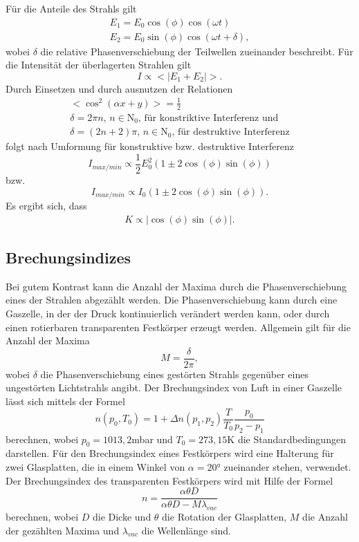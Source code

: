 Für die Anteile des Strahls gilt
\begin{gather}
  E_1 = E_0\cos(\phi)\cos(\omega t) \\
  E_2 = E_0\sin(\phi)\cos(\omega t + \delta),
\end{gather}
wobei $\delta$ die relative Phasenverschiebung der Teilwellen zueinander beschreibt.
Für die Intensität der überlagerten Strahlen gilt
\begin{equation*}
  I \propto <|E_1 + E_2|>.
\end{equation*}
Durch Einsetzen und durch ausnutzen der Relationen
\begin{gather*}
  <\cos^2(\alpha x + y)> = \frac{1}{2} \\
  \delta = 2\pi n , \, n\in\mathrm{N}_0,\, \text{für konstriktive Interferenz und} \\
  \delta = (2n+2)\pi,\, n\in\mathrm{N}_0,\, \text{für destruktive Interferenz}
\end{gather*}
folgt nach Umformung für konstruktive bzw. destruktive Interferenz
\begin{equation*}
  I_{max/min} \propto \frac{1}{2}E_0^2 (1 \pm 2\cos(\phi)\sin(\phi))
\end{equation*}
bzw.
\begin{equation}
  I_{max/min} \propto I_0(1 \pm 2\cos(\phi)\sin(\phi)).
\end{equation}
Es ergibt sich, dass
\begin{align}
  K \propto |\cos(\phi)\sin(\phi)|.
\end{align}

\subsection{Brechungsindizes}
Bei gutem Kontrast kann die Anzahl der Maxima durch die Phasenverschiebung eines
der Strahlen abgezählt werden. Die Phasenverschiebung kann durch eine Gaszelle,
in der der Druck kontinuierlich verändert werden kann, oder durch einen rotierbaren
transparenten Festkörper erzeugt werden.
Allgemein gilt für die Anzahl der Maxima
\begin{equation*}
  M = \frac{\delta}{2\pi},
\end{equation*}
wobei $\delta$ die Phasenverschiebung eines gestörten Strahls gegenüber eines
ungestörten Lichtstrahls angibt.
Der Brechungsindex von Luft in einer Gaszelle lässt sich mittels der Formel
\begin{equation}
  n(p_0, T_0) = 1 + \Delta n(p_1,p_2)\frac{T}{T_0}\frac{p_0}{p_2-p_1}
\end{equation}
berechnen, wobei $p_0 = 1013,2$mbar und $T_0 = 273,15$K die Standardbedingungen darstellen.
Für den Brechungsindex eines Festkörpers wird eine Halterung für zwei Glasplatten,
die in einem Winkel von $\alpha = 20°$ zueinander stehen, verwendet.
Der Brechungsindex des transparenten Festkörpers wird mit Hilfe der Formel
\begin{equation}
  n = \frac{\alpha\theta D}{\alpha\theta D - M\lambda_{vac}}
\end{equation}
berechnen, wobei $D$ die Dicke und $\theta$ die Rotation der Glasplatten, $M$ die
Anzahl der gezählten Maxima und $\lambda_{vac}$ die Wellenlänge sind.
